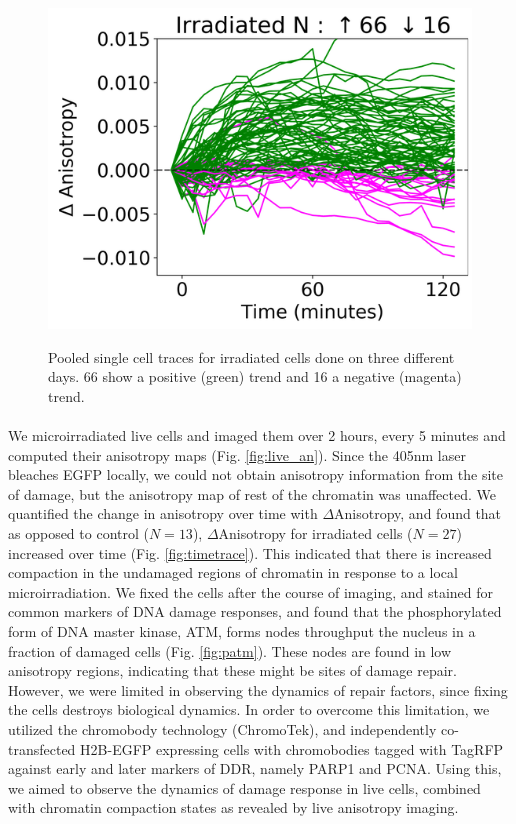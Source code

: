 \begin{figure}[H]
    {\hfill\includegraphics[clip, width=0.8\linewidth]{figures/closely.png}\hspace*{\fill}}
    \caption{Pooled single cell traces for irradiated cells done on three different days. 66 show a positive (green) trend and 16 a negative (magenta) trend.}
    {\label{fig:closely}}
\end{figure}


\paragraph*{} We microirradiated live cells and imaged them over 2 hours, every 5 minutes and computed their anisotropy maps (Fig. \ref{fig:live_an}). Since the 405nm laser bleaches EGFP locally, we could not obtain anisotropy information from the site of damage, but the anisotropy map of rest of the chromatin was unaffected. We quantified the change in anisotropy over time with $\Delta$Anisotropy, and found that as opposed to control (\(N=13\)), $\Delta$Anisotropy for irradiated cells (\(N=27\)) increased over time (Fig. \ref{fig:timetrace}). This indicated that there is increased compaction in the undamaged regions of chromatin in response to a local microirradiation. We fixed the cells after the course of imaging, and stained for common markers of DNA damage responses, and found that the phosphorylated form of DNA master kinase, ATM, forms nodes throughput the nucleus in a fraction of damaged cells (Fig. \ref{fig:patm}). These nodes are found in low anisotropy regions, indicating that these might be sites of damage repair. However, we were limited in observing the dynamics of repair factors, since fixing the cells destroys biological dynamics. In order to overcome this limitation, we utilized the chromobody technology (ChromoTek), and independently co-transfected H2B-EGFP expressing cells with chromobodies tagged with TagRFP against early and later markers of DDR, namely PARP1 and PCNA. Using this, we aimed to observe the dynamics of damage response in live cells, combined with chromatin compaction states as revealed by live anisotropy imaging.

